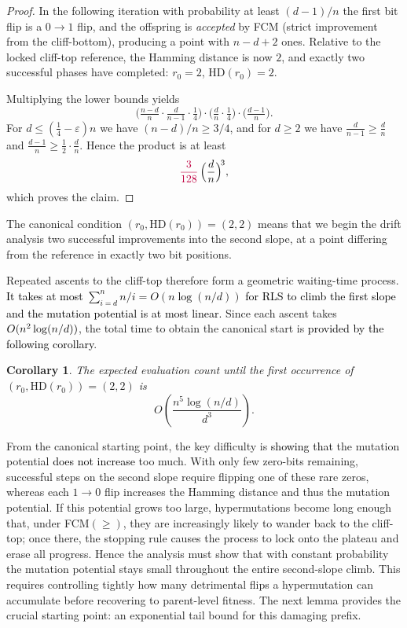 \documentclass[lettersize,journal]{IEEEtran}
\newcommand{\new}[1]{\textcolor{black}{#1}}
\newcommand{\rerev}[1]{\textcolor{purple}{#1}}
\newcommand{\rev}[1]{\textcolor{black}{#1}}
\newcommand{\HD}{\text{HD}}
\newtheorem{corollary}{Corollary}
\begin{document}
{\begin{proof}
 In the following iteration with probability at least $(d-1)/n$ the first bit flip is a $0\!\to 1$ flip, and the offspring is \emph{accepted} by FCM (strict improvement from the cliff-bottom), producing a point with $n-d+2$ ones. Relative to the locked cliff-top reference, the Hamming distance is now $2$, and exactly two successful phases have completed: $r_0=2$, $\HD(r_0)=2$.
	
	Multiplying the lower bounds yields
	\[
	\Big(\tfrac{n-d}{n}\cdot\tfrac{d}{n-1}\cdot\tfrac14\Big)\cdot
	\Big(\tfrac{d}{n}\cdot\tfrac14\Big)\cdot
	\Big(\tfrac{d-1}{n}\Big).
	\]
	For $d\le(\tfrac14-\varepsilon)n$ we have $(n-d)/n\ge 3/4$, and for $d\ge 2$ we have $\tfrac{d}{n-1}\ge\tfrac{d}{n}$ and $\tfrac{d-1}{n}\ge \tfrac12\cdot\tfrac{d}{n}$. Hence the product is at least
	\[
	\rerev{\frac{3}{128}}\,\Big(\frac{d}{n}\Big)^{\!3},
	\]
	which proves the claim.
\end{proof}

The canonical condition $(r_0,\mathrm{HD}(r_0)) =
(2,2)$ means that we begin the drift analysis two successful improvements into
the second slope, at a point differing from the reference in exactly two
bit positions.

Repeated ascents to the cliff-top therefore form a geometric waiting-time 
process.   \rev{It takes at most $\sum_{i=d}^{n}n/i=O(n\log(n/d))$ for RLS to climb the first slope and the mutation potential is at most linear.
} Since each ascent takes $\rev{O}(n^2\log(n/d))$, the 
total time to obtain the canonical start is \new{provided by the following corollary}.

\begin{corollary}
The expected evaluation count until the first occurrence of 
	$(r_0,\mathrm{HD}(r_0)) = (2,2)$ is 
	\[
	O\!\left(\frac{n^{5}\log(n/d)}{d^{3}}\right).
	\]
\end{corollary}


From the canonical starting point, the key difficulty is \new{showing that} the mutation
potential \new{does not increase} too much.  With only few zero-bits remaining, successful
steps on the second slope require flipping one of these rare zeros, whereas each
$1\!\to0$ flip increases the Hamming distance and thus the mutation potential.
If this potential grows too large, hypermutations become long enough that, under
FCM$(\ge)$, they are increasingly likely to wander back to the cliff-top; once
there, the stopping rule causes the process to lock onto the plateau and erase
all progress.  Hence the analysis must show that with constant probability the
mutation potential stays small throughout the entire second-slope climb.  This
requires  controlling tightly how many detrimental flips a hypermutation can
accumulate before recovering to parent-level fitness.  The next lemma provides
the crucial starting point: an exponential tail bound for this damaging prefix.

}
\end{document}
